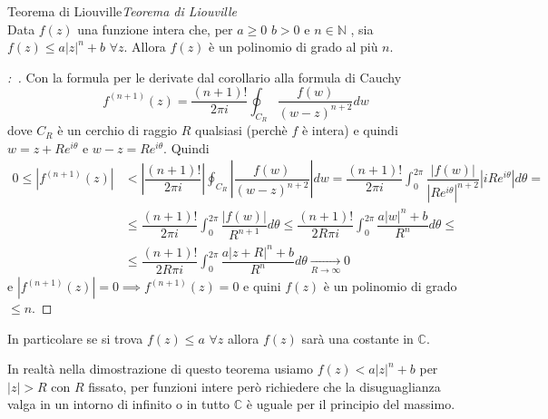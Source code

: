 \documentclass[11pt,a4paper,twoside]{book}
\newenvironment{teorema}[1][\empty]{\begin{Teorema}{
\ifx\empty#1\relax\else\mdseries\itshape#1\\\fi
}{}}{\end{Teorema}}
\newenvironment{dimo}[1][\proofname]{
	\begin{tcolorbox}[
	breakable, 
	enhanced, 
	interior hidden, 
	frame hidden, 
	borderline west = {1pt}{0pt}{gray}, 
	top=0pt, bottom=0pt, left=0pt]
\begin{proof}[#1:~]
}
{
\end{proof}
\end{tcolorbox}
}
\theoremstyle{esss}
\theoremstyle{dotless}
\numberwithin{equation}{section} %
\begin{document}
\begin{teorema}[Teorema di Liouville]
Data $f(z)$ una funzione intera che, per $a\geq0$ $b> 0$ e $n\in\mathbb{N}$ , sia $f(z)\leq a|z|^n+b$ $\forall z$. Allora $f(z)$ è un polinomio di grado al più $n$.
\end{teorema}
\begin{dimo}
Con la formula per le derivate dal corollario alla formula di Cauchy
\[
f^{(n+1)}(z)=\dfrac{(n+1)!}{2\pi i} \oint_{C_R} \dfrac{f(w)}{(w-z)^{n+2}} dw
\]
dove $C_R$ è un cerchio di raggio $R$ qualsiasi (perchè $f$ è intera) e quindi $w=z+Re^{i\theta}$ e $w-z=Re^{i\theta}$. Quindi
\begin{align*}
0 \leq \left| f^{(n+1)}(z)\right| & < \left| \dfrac{(n+1)!}{2\pi i} \right| \oint_{C_R} \left|\dfrac{f(w)}{(w-z)^{n+2}} \right| dw = \dfrac{(n+1)!}{2\pi i}\int_0^{2\pi} \dfrac{\left|f(w)\right|}{\left|Re^{i\theta}\right|^{n+2}} \left| iRe^{i\theta} \right| d\theta = \\
& \leq \dfrac{(n+1)!}{2\pi i}\int_0^{2\pi} \dfrac{\left|f(w)\right|}{R^{n+1}} d\theta \leq  
\dfrac{(n+1)!}{2R\pi i}\int_0^{2\pi} \dfrac{a \left|w \right|^n +b}{R^{n}} d\theta \leq \\ & \leq \dfrac{(n+1)!}{2R\pi i}\int_0^{2\pi} \dfrac{a \left|z+ R \right|^n +b}{R^{n}} d\theta  \underset{R\rightarrow \infty}{\longrightarrow} 0
\end{align*}
e $|f^{(n+1)}(z)|=0\implies f^{(n+1)}(z)=0$ e quini $f(z)$ è un polinomio di grado $\leq n$. \qedhere
\end{dimo}

In particolare se si trova $f(z)\leq a$ $\forall z$ allora $f(z)$ sarà una costante in $\mathbb{C}$.

In realtà nella dimostrazione di questo teorema usiamo $f(z)<a|z|^n+b$ per $|z|>R$ con $R$ fissato, per funzioni intere però richiedere che la disuguaglianza valga in un intorno di infinito o in tutto $\mathbb{C}$ è uguale per il principio del massimo.
\end{document}
